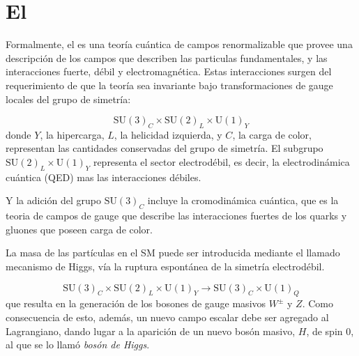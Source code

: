 \section{El \SM}

Formalmente, el {\SM} es una teoría cuántica de campos renormalizable que provee
una descripción de los campos que describen las particulas fundamentales, y las
interacciones fuerte, débil y electromagnética.
Estas interacciones surgen del requerimiento de que la teoría sea invariante
bajo transformaciones de gauge locales del grupo de simetría:

\begin{equation}
  \text{SU}(3)_C \times \text{SU}(2)_L \times \text{U}(1)_Y
\end{equation}
%
donde $Y$, la hipercarga, $L$, la helicidad izquierda, y $C$, la carga de color,
representan las cantidades conservadas del grupo de simetría. El subgrupo
$\text{SU}(2)_L \times \text{U}(1)_Y$ representa el sector electrodébil, es
decir, la electrodinámica cuántica (QED) mas las interacciones débiles.


Y la adición del grupo $\text{SU}(3)_C$ incluye la cromodinámica cuántica, que
es la teoria de campos de gauge que describe las interacciones fuertes de los
quarks y gluones que poseen carga de color.

La masa de las partículas en el SM puede ser introducida mediante el llamado
mecanismo de Higgs\cite{PhysRevLett.13.321, PhysRevLett.13.508}, vía la ruptura
espontánea de la simetría electrodébil.

\begin{equation}
  \text{SU}(3)_C \times \text{SU}(2)_L \times \text{U}(1)_Y \to \text{SU}(3)_C
  \times \text{U}(1)_Q
\end{equation}
%
que resulta en la generación de los bosones de gauge masivos $W^\pm$ y $Z$. Como
consecuencia de esto, además, un nuevo campo escalar debe ser agregado al
Lagrangiano, dando lugar a la aparición de un nuevo bosón masivo, $H$, de spin
0, al que se lo llamó \emph{bosón de Higgs}.

